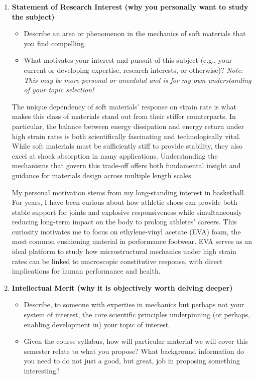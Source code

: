 \begin{enumerate}
\item \textbf{Statement of Research Interest (why you personally want to study the subject)}
\begin{itemize}
\item Describe an area or phenomenon in the mechanics of soft materials that you find compelling. 
\item What motivates your interest and pursuit of this subject (e.g., your current or developing expertise, research interests, or otherwise)? \textit{Note: This may be more personal or anecdotal and is for my own understanding of your topic selection!}
\end{itemize}

The unique dependency of soft materials’ response on strain rate is what makes this class of materials stand out from their stiffer counterparts. In particular, the balance between energy dissipation and energy return under high strain rates is both scientifically fascinating and technologically vital. While soft materials must be sufficiently stiff to provide stability, they also excel at shock absorption in many applications. Understanding the mechanisms that govern this trade-off offers both fundamental insight and guidance for materials design across multiple length scales.

My personal motivation stems from my long-standing interest in basketball. For years, I have been curious about how athletic shoes can provide both stable support for joints and explosive responsiveness while simultaneously reducing long-term impact on the body to prolong athletes’ careers. This curiosity motivates me to focus on ethylene-vinyl acetate (EVA) foam, the most common cushioning material in performance footwear. EVA serves as an ideal platform to study how microstructural mechanics under high strain rates can be linked to macroscopic constitutive response, with direct implications for human performance and health.

\item \textbf{Intellectual Merit (why it is objectively worth delving deeper)}
\begin{itemize}
\item Describe, to someone with expertise in mechanics but perhaps not your system of interest, the core scientific principles underpinning (or perhaps, enabling development in) your topic of interest. 
\item Given the course syllabus, how will particular material we will cover this semester relate to what you propose? What background information do you need to do not just a good, but great, job in proposing something interesting? 
\end{itemize}


\end{enumerate}
